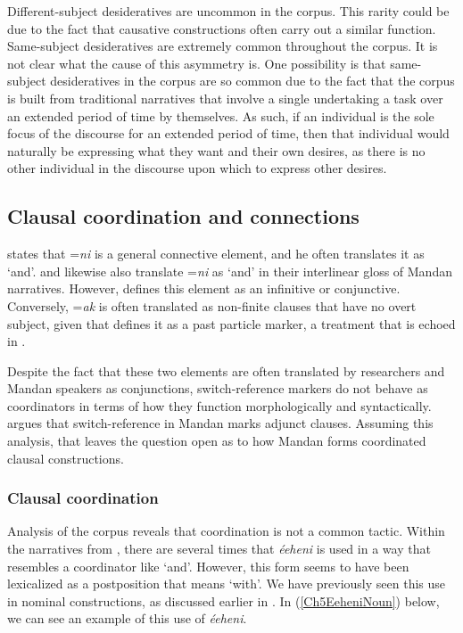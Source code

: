 Different-subject desideratives are uncommon in the corpus. This rarity could be due to the fact that causative constructions often carry out a similar function. Same-subject desideratives are extremely common throughout the corpus. It is not clear what the cause of this asymmetry is. One possibility is that same-subject desideratives in the corpus are so common due to the fact that the corpus is built from traditional narratives that involve a single undertaking a task over an extended period of time by themselves. As such, if an individual is the sole focus of the discourse for an extended period of time, then that individual would naturally be expressing what they want and their own desires, as there is no other individual in the discourse upon which to express other desires.


\subsection{Clausal coordination and connections}\label{Ch5Coordination}

\citet[24]{kennard1936} states that =\textit{ni} is a general connective element, and he often translates it as `and'. \citet{hollow1973a,hollow1973b} and \citet{trechter2012b} likewise also translate =\textit{ni} as `and' in their interlinear gloss of Mandan narratives. However, \citet[472]{hollow1970} defines this element as an infinitive or conjunctive. Conversely, =\textit{ak} is often translated as non-finite clauses that have no overt subject, given that \citet[22]{kennard1936} defines it as a past particle marker, a treatment that is echoed in \citet[430]{hollow1970}.

Despite the fact that these two elements are often translated by researchers and Mandan speakers as conjunctions, switch-reference markers do not behave as coordinators in terms of how they function morphologically and syntactically. \citet[53]{kasak2019} argues that switch-reference in Mandan marks adjunct clauses. Assuming this analysis, that leaves the question open as to how Mandan forms coordinated clausal constructions.

\subsubsection{Clausal coordination}\label{Ch5SubsecCoordination}

Analysis of the corpus reveals that coordination is not a common tactic. Within the narratives from \citet{hollow1973a,hollow1973b}, there are several times that \textit{éeheni} is used in a way that resembles a coordinator like `and'. However, this form seems to have been lexicalized as a postposition that means `with'. We have previously seen this use in nominal constructions, as discussed earlier in . In (\ref{Ch5EeheniNoun}) below, we can see an example of this use of \textit{éeheni}.

